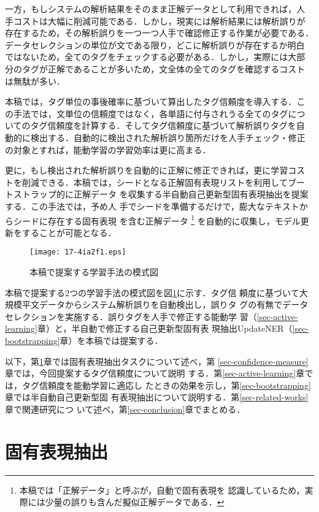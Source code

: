 \documentclass[japanese]{jnlp_1.4}
\begin{document}
一方，もしシステムの解析結果をそのまま正解データとして利用できれば，人
手コストは大幅に削減可能である．しかし，現実には解析結果には解析誤りが
存在するため，その解析誤りを一つ一つ人手で確認修正する作業が必要である．
データセレクションの単位が文である限り，どこに解析誤りが存在するか明白
ではないため，全てのタグをチェックする必要がある．しかし，実際には大部
分のタグが正解であることが多いため，文全体の全てのタグを確認するコスト
は無駄が多い．

本稿では，タグ単位の事後確率に基づいて算出したタグ信頼度を導入する．こ
の手法では，文単位の信頼度ではなく，各単語に付与されうる全てのタグにつ
いてのタグ信頼度を計算する．そしてタグ信頼度に基づいて解析誤りタグを自
動的に検出する．自動的に検出された解析誤り箇所だけを人手チェック・修正
の対象とすれば，能動学習の学習効率は更に高まる．

更に，もし検出された解析誤りを自動的に正解に修正できれば，更に学習コス
トを削減できる．本稿では，シードとなる正解固有表現リストを利用してブー
トストラップ的に正解データ
を収集する半自動自己更新型固有表現抽出を提案する．この手法では，予め人
手でシードを準備するだけで，膨大なテキストからシードに存在する固有表現
を含む正解データ
\footnote{本稿では「正解データ」と呼ぶが，自動で固有表現を
認識しているため，実際には少量の誤りも含んだ擬似正解データである．} 
を自動的に収集し，モデル更新をすることが可能となる．

\begin{figure}[b]
\begin{center}
\texttt{[image: 17-4ia2f1.eps]}
\end{center}
\caption{本稿で提案する学習手法の模式図}
\label{fig-overall}
\end{figure}


本稿で提案する2つの学習手法の模式図を図\ref{fig-overall}に示す．タグ信
頼度に基づいて大規模平文データからシステム解析誤りを自動検出し，誤りタ
グの有無でデータセレクションを実施する．誤りタグを人手で修正する能動学
習（\ref{sec-active-learning}章）と，半自動で修正する自己更新型固有表
現抽出UpdateNER（\ref{sec-bootstrapping}章）を本稿では提案する．

以下，第\ref{sec-ner}章では固有表現抽出タスクについて述べ，第
\ref{sec-confidence-measure}章では，今回提案するタグ信頼度について説明
する．第\ref{sec-active-learning}章では，タグ信頼度を能動学習に適応し
たときの効果を示し，第\ref{sec-bootstrapping}章では半自動自己更新型固
有表現抽出について説明する．第\ref{sec-related-works}章で関連研究につ
いて述べ，第\ref{sec-conclusion}章でまとめる．


\section{固有表現抽出}
\label{sec-ner}
\end{document}
